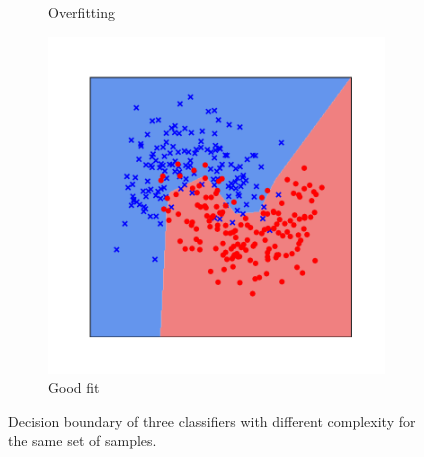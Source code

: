 \begin{figure}[t]
\begin{subfigure}[b]{0.32\textwidth}
    \caption{Overfitting}
    \label{figure:ch2-fitting_points_b}
  \end{subfigure}
  \hfill
  \begin{subfigure}[b]{0.32\textwidth}
    \includegraphics[width=0.98\textwidth]{figures/main/ch2-background/normal.pdf}
    \caption{Good fit}
    \label{figure:ch2-fitting_points_c}
  \end{subfigure}
  \caption{
    Decision boundary of three classifiers with different complexity for the same set of samples.
  }
  \label{figure:ch2-fitting_points}
\end{figure}


